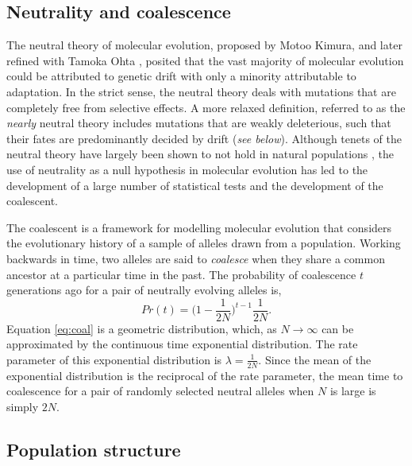 \subsection{Neutrality and coalescence}

	The neutral theory of molecular evolution, proposed by Motoo Kimura, and later refined with Tamoka Ohta \citep{RN175}, posited that the vast majority of molecular evolution could be attributed to genetic drift with only a minority attributable to adaptation. In the strict sense, the neutral theory deals with mutations that are completely free from selective effects. A more relaxed definition, referred to as the \textit{nearly} neutral theory includes mutations that are weakly deleterious, such that their fates are predominantly decided by drift (\textit{see below}). Although tenets of the neutral theory have largely been shown to not hold in natural populations \citep{RN386, RN358, RN357}, the use of neutrality as a null hypothesis in molecular evolution has led to the development of a large number of statistical tests and the development of the coalescent.

	The coalescent is a framework for modelling molecular evolution that considers the evolutionary history of a sample of alleles drawn from a population. Working backwards in time, two alleles are said to \textit{coalesce} when they share a common ancestor at a particular time in the past. The probability of coalescence $t$ generations ago for a pair of neutrally evolving alleles is,
	\begin{equation}
	Pr(t) = \Big(1 - \frac{1}{2N}\Big)^{t-1}\frac{1}{2N}.
	\label{eq:coal}
	\end{equation}
\noindent
Equation \ref{eq:coal} is a geometric distribution, which, as $N \to \infty$ can be approximated by the continuous time exponential distribution. The rate parameter of this exponential distribution is $\lambda = \frac{1}{2N}$. Since the mean of the exponential distribution is the reciprocal of the rate parameter, the mean time to coalescence for a pair of randomly selected neutral alleles  when $N$ is large is simply $2N$.
		
\subsection{Population structure}

